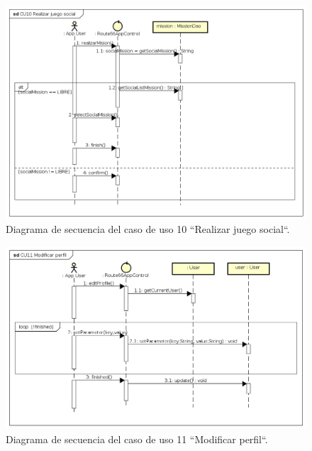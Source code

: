 \documentclass[twoside]{report}
\begin{document}
\begin{figure}[H]
\begin{center}
\includegraphics[scale=0.5]{images/sequence/CU10}
\caption{Diagrama de secuencia del caso de uso 10 “Realizar juego social“.}
\end{center}
\end{figure}

\begin{figure}[H]
\begin{center}
\includegraphics[width=\textwidth]{images/sequence/CU11}
\caption{Diagrama de secuencia del caso de uso 11 “Modificar perfil“.}
\end{center}
\end{figure}
\end{document}
